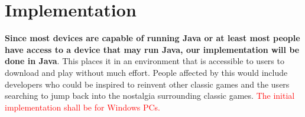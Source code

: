 \documentclass[12pt, titlepage]{article}
\begin{document}
\section {Implementation}
\textbf{Since most devices are capable of running Java or at least most people have access to a device that may run Java, our implementation will be done in Java}. This places it in an environment that is accessible to users to download and play without much effort. People affected by this would include developers who could be inspired to reinvent other classic games and the users searching to jump back into the nostalgia surrounding classic games. \textcolor{red}{The initial implementation shall be for Windows PCs.}
\end{document}
